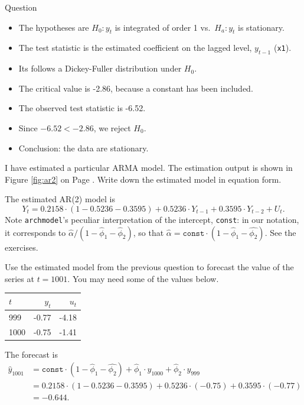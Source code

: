 \documentclass[12pt, a4paper]{article}
\begin{document}
\begin{exam}{Question \thequestion}
\begin{problem}[6]
\begin{solution}[10cm]
\begin{itemize}
\item The hypotheses are $H_0: y_t$ is integrated of order 1 vs.\ $H_a: y_t$ is stationary.
\item The test statistic is the estimated coefficient on the lagged level, $y_{t-1}$ (\texttt{x1}).
\item Its follows a Dickey-Fuller distribution  under $H_0$.
\item The critical value is -2.86, because a constant has been included.
\item The observed test statistic is -6.52.
\item Since $-6.52 < -2.86$, we reject $H_0$.
\item Conclusion: the data are stationary.
\end{itemize}
\end{solution}
\end{problem}
\begin{problem}[3]
I have estimated a particular ARMA model. The estimation output is shown in Figure \ref{fig:ar2} on Page \pageref{fig:ar2}. Write down the estimated model in equation form.
\begin{solution}[10cm]
The estimated AR(2) model is
\[
Y_t =0.2158\cdot (1-0.5236-0.3595) +  0.5236\cdot  Y_{t-1} + 0.3595 \cdot Y_{t-2}+U_t.
\]
Note \texttt{archmodel}'s peculiar interpretation of the intercept, \texttt{const}: in our notation, it corresponds to $\hat{\alpha}/ (1-\hat{\phi}_1-\hat{\phi}_2)$, so that $\hat{\alpha} = \mathtt{const}\cdot (1-\hat{\phi}_1 - \hat{\phi_2})$. See the exercises.
\end{solution}
\end{problem}
\begin{problem}[6]
Use the estimated model from the previous question to forecast the value of the series at $t=1001$. You may need some of the values below.
\begin{center}
\begin{tabular}{lrr}
\toprule
$t$ & $y_t$ & $u_t$\\
\midrule
999 & -0.77 & -4.18\\
1000& -0.75 & -1.41\\
\bottomrule
\end{tabular}
\end{center}
\begin{solution}[5cm]
The forecast is
\begin{align*}
\widehat{y}_{1001} &= \mathtt{const}\cdot (1-\hat{\phi}_1 - \hat{\phi_2})+\hat{\phi}_1\cdot  y_{1000} + \hat{\phi}_2 \cdot y_{999}\\
&=  0.2158 \cdot (1-0.5236-0.3595) + 0.5236\cdot  (-0.75) + 0.3595 \cdot (-0.77)\\
&= -0.644.
\end{align*}
\end{solution}
\end{problem}

\end{exam}
\end{document}
